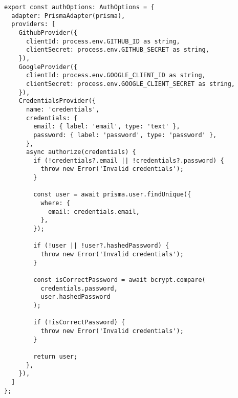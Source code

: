 \begin{verbatim}
export const authOptions: AuthOptions = {
  adapter: PrismaAdapter(prisma),
  providers: [
    GithubProvider({
      clientId: process.env.GITHUB_ID as string,
      clientSecret: process.env.GITHUB_SECRET as string,
    }),
    GoogleProvider({
      clientId: process.env.GOOGLE_CLIENT_ID as string,
      clientSecret: process.env.GOOGLE_CLIENT_SECRET as string,
    }),
    CredentialsProvider({
      name: 'credentials',
      credentials: {
        email: { label: 'email', type: 'text' },
        password: { label: 'password', type: 'password' },
      },
      async authorize(credentials) {
        if (!credentials?.email || !credentials?.password) {
          throw new Error('Invalid credentials');
        }

        const user = await prisma.user.findUnique({
          where: {
            email: credentials.email,
          },
        });

        if (!user || !user?.hashedPassword) {
          throw new Error('Invalid credentials');
        }

        const isCorrectPassword = await bcrypt.compare(
          credentials.password,
          user.hashedPassword
        );

        if (!isCorrectPassword) {
          throw new Error('Invalid credentials');
        }

        return user;
      },
    }),
  ]
};
\end{verbatim}